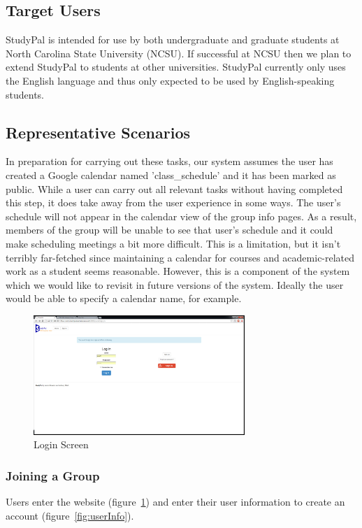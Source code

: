 \documentclass[conference]{IEEEtran}
\begin{document}
\subsection{Target Users}
StudyPal is intended for use by both undergraduate and graduate students at North Carolina State University (NCSU).
If successful at NCSU then we plan to extend StudyPal to students at other universities.
StudyPal currently only uses the English language and thus only expected to be used by English-speaking students.


\subsection{Representative Scenarios}

In preparation for carrying out these tasks, our system assumes the user has created a Google calendar named 'class\_schedule' and it has been marked as public.  While a user can carry out all relevant tasks without having completed this step, it does take away from the user experience in some ways.  The user's schedule will not appear in the calendar view of the group info pages. As a result, members of the group will be unable to see that user's schedule and it could make scheduling meetings a bit more difficult. This is a limitation, but it isn't terribly far-fetched since maintaining a calendar for courses and academic-related work as a student seems reasonable.  However, this is a component of the system which we would like to revisit in future versions of the system.  Ideally the user would be able to specify a calendar name, for example.

\begin{figure}[ht!]
\centering
\includegraphics[width=80mm]{figures/login}
\caption{Login Screen \label{fig:login}}
\end{figure}

\subsubsection{Joining a Group}
Users enter the website (figure~\ref{fig:login}) and enter their user information to create an account (figure~\ref{fig:userInfo}). 
\end{document}
